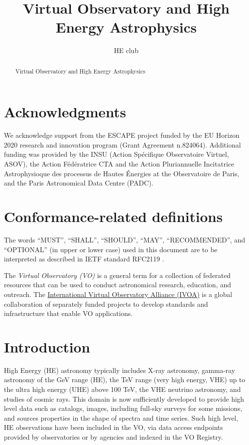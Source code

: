 \documentclass[11pt,a4paper]{ivoa}
\title{Virtual Observatory and High Energy Astrophysics}
\author{HE club}
\begin{document}
\begin{abstract}
Virtual Observatory and High Energy Astrophysics
\end{abstract}


\section*{Acknowledgments}

We acknowledge support from the ESCAPE project funded by the EU Horizon 2020 research and innovation program (Grant Agreement n.824064).
Additional funding was provided by the INSU (Action Sp\'ecifique Observatoire Virtuel, ASOV), the Action F\'ed\'eratrice
CTA and the Action Pluriannuelle Incitatrice Astrophysioque des processus de Hautes \'Energies at the Observatoire de
Paris, and the Paris Astronomical Data Centre (PADC).

\section*{Conformance-related definitions}

The words ``MUST'', ``SHALL'', ``SHOULD'', ``MAY'', ``RECOMMENDED'', and
``OPTIONAL'' (in upper or lower case) used in this document are to be
interpreted as described in IETF standard RFC2119 \citep{std:RFC2119}.

The \emph{Virtual Observatory (VO)} is a
general term for a collection of federated resources that can be used
to conduct astronomical research, education, and outreach.
The \href{https://www.ivoa.net}{International
Virtual Observatory Alliance (IVOA)} is a global
collaboration of separately funded projects to develop standards and
infrastructure that enable VO applications.


\section{Introduction}


High Energy (HE) astronomy typically includes X-ray astronomy, gamma-ray astronomy of the GeV range (HE), the TeV range
(very high energy, VHE) up to the ultra high energy (UHE) above 100 TeV, the VHE neutrino
astronomy, and studies of cosmic rays. This domain is now sufficiently developed to provide high level data such as catalogs, images, including full-sky surveys for some missions, and sources properties in the shape of spectra and time series.
Such high level, HE observations have been included in the VO, via data access endpoints provided by observatories or by agencies and indexed in the VO Registry.
\end{document}
